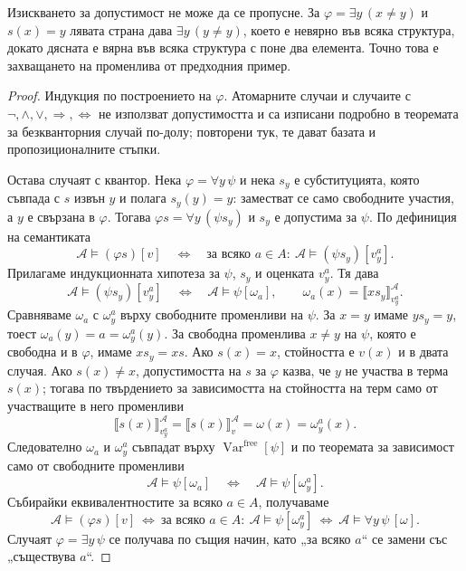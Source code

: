 \begin{remark}
Изискването за допустимост не може да се пропусне. За
$\varphi=\exists y\,(x\ne y)$ и $s(x)=y$ лявата страна дава
$\exists y\,(y\ne y)$, което е невярно във всяка структура, докато дясната е
вярна във всяка структура с поне два елемента. Точно това е захващането на
променлива от предходния пример.
\end{remark}

\begin{proof}
Индукция по построението на $\varphi$. Атомарните случаи и случаите с
$\neg,\wedge,\vee,\Rightarrow,\Leftrightarrow$ не използват допустимостта и са
изписани подробно в теоремата за безкванторния случай по-долу; повторени тук,
те дават базата и пропозиционалните стъпки.

Остава случаят с квантор. Нека $\varphi=\forall y\,\psi$ и нека $s_y$ е
субституцията, която съвпада с $s$ извън $y$ и полага $s_y(y)=y$: заместват се
само свободните участия, а $y$ е свързана в $\varphi$. Тогава
$\varphi s=\forall y\,(\psi s_y)$ и $s_y$ е допустима за $\psi$. По дефиниция на
семантиката
\[
\mathcal A\models(\varphi s)[v]
\quad\Longleftrightarrow\quad
\text{за всяко }a\in A:\ \mathcal A\models(\psi s_y)[v_y^a].
\]
Прилагаме индукционната хипотеза за $\psi$, $s_y$ и оценката $v_y^a$. Тя дава
\[
\mathcal A\models(\psi s_y)[v_y^a]
\quad\Longleftrightarrow\quad
\mathcal A\models\psi[\omega_a],
\qquad
\omega_a(x)=\llbracket xs_y\rrbracket^{\mathcal A}_{v_y^a}.
\]
Сравняваме $\omega_a$ с $\omega_y^a$ върху свободните променливи на $\psi$.
За $x=y$ имаме $ys_y=y$, тоест $\omega_a(y)=a=\omega_y^a(y)$. За свободна
променлива $x\ne y$ на $\psi$, която е свободна и в $\varphi$, имаме
$xs_y=xs$. Ако $s(x)=x$, стойността е $v(x)$ и в двата случая. Ако
$s(x)\ne x$, допустимостта на $s$ за $\varphi$ казва, че $y$ не участва в
терма $s(x)$; тогава по твърдението за зависимостта на стойността на терм само
от участващите в него променливи
\[
\llbracket s(x)\rrbracket^{\mathcal A}_{v_y^a}
=
\llbracket s(x)\rrbracket^{\mathcal A}_{v}
=\omega(x)=\omega_y^a(x).
\]
Следователно $\omega_a$ и $\omega_y^a$ съвпадат върху
$\operatorname{Var}^{\mathrm{free}}[\psi]$ и по теоремата за зависимост само от
свободните променливи
\[
\mathcal A\models\psi[\omega_a]
\quad\Longleftrightarrow\quad
\mathcal A\models\psi[\omega_y^a].
\]
Събирайки еквивалентностите за всяко $a\in A$, получаваме
\[
\mathcal A\models(\varphi s)[v]
\ \Longleftrightarrow\
\text{за всяко }a\in A:\ \mathcal A\models\psi[\omega_y^a]
\ \Longleftrightarrow\
\mathcal A\models\forall y\,\psi\,[\omega].
\]
Случаят $\varphi=\exists y\,\psi$ се получава по същия начин, като „за всяко
$a$“ се замени със „съществува $a$“.
\end{proof}

